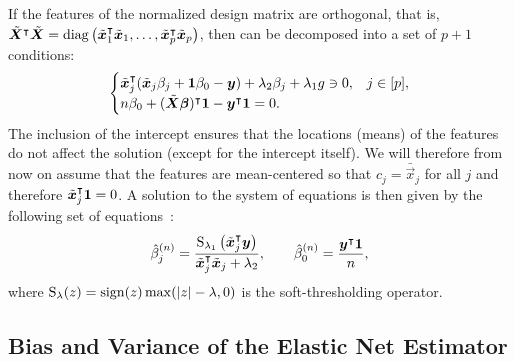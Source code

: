 If the features of the normalized design matrix are orthogonal, that is,
\(\tilde{\bm{X}}^\intercal \tilde{\bm{X}} = \operatorname{diag}\left(\tilde{\bm{x}}_1^\intercal
\tilde{\bm{x}}_1, \dots, \tilde{\bm{x}}_p^\intercal \tilde{\bm{x}}_p\right) \), then
 can be decomposed into a set of \(p + 1\) conditions:
%
\[
  \begin{cases}
    \tilde{\bm{x}}_j^\intercal (\tilde{\bm{x}}_j \beta_j + \bm{1} \beta_0 - \bm{y}) + \lambda_2 \beta_j + \lambda_1 g \ni 0, & j \in [p], \\
    n \beta_0 + (\tilde{\bm{X}}\bm{\beta})^\intercal \bm{1} -  \bm{y}^\intercal \bm{1} = 0.
  \end{cases}
\]
%
The inclusion of the intercept ensures that the locations (means) of the features do not
affect the solution (except for the intercept itself). We will therefore from now on assume
that the features are mean-centered so that \(c_j = \bar{\vec{x}}_j\) for all \(j\) and
therefore \(\tilde{\bm{x}}_j^\intercal \bm{1} = 0\). A solution to the system of equations is then
given by the following set of equations~\citep{donoho1994}:
%
\begin{equation*}
  \hat{\beta}^{(n)}_j = \frac{\operatorname{S}_{\lambda_1}\left(\tilde{\bm{x}}_j^\intercal \bm{y}\right)}{\tilde{\bm{x}}_j^\intercal \tilde{\bm{x}}_j + \lambda_2},
  \qquad
  \hat{\beta}_0^{(n)} = \frac{\bm{y}^\intercal \bm{1}}{n},
\end{equation*}
%
where \(\operatorname{S}_\lambda(z) = \operatorname{sign}(z) \max(|z| - \lambda, 0)\) is the soft-thresholding
operator.

\subsection{Bias and Variance of the Elastic Net Estimator}
\label{sec:bias-var-deriv}

